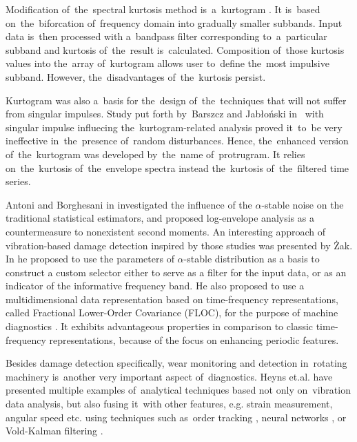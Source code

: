 Modification of~the~spectral kurtosis method is~a~kurtogram \cite{antoni2007fast}. It is~based on~the~biforcation of~frequency domain into gradually smaller subbands. Input data is~then processed with a~bandpass filter corresponding to~a~particular subband and kurtosis of~the~result is~calculated. Composition of~those kurtosis values into the~array of~kurtogram allows user to~define the~most impulsive subband. However, the~disadvantages of~the~kurtosis persist. 

Kurtogram was also a~basis for the~design of~the~techniques that will not suffer from singular impulses. Study put forth by~Barszcz and Jabłoński in~\cite{barszcz_mssp} with singular impulse influecing the~kurtogram-related analysis proved it~to~be very ineffective in~the~presence of~random disturbances. Hence, the~enhanced version of~the~kurtogram was developed by~the~name of~protrugram. It relies on~the~kurtosis of~the~envelope spectra instead the~kurtosis of~the~filtered time series.

Antoni and Borghesani in \cite{BORGHESANI2017378} investigated the influence of the $\alpha$-stable noise on the traditional statistical estimators, and proposed log-envelope analysis as a countermeasure to nonexistent second moments. An interesting approach of vibration-based damage detection inspired by those studies was presented by Żak. In \cite{11419466920160301} he proposed to use the parameters of $\alpha$-stable distribution as a basis to construct a custom selector either to serve as a filter for the input data, or as an indicator of the informative frequency band. He also proposed to use a multidimensional data representation based on time-frequency representations, called Fractional Lower-Order Covariance (FLOC), for the purpose of machine diagnostics \cite{Zak2014}. It exhibits advantageous properties in comparison to classic time-frequency representations, because of the focus on enhancing periodic features.

Besides damage detection specifically, wear monitoring and detection in~rotating machinery is~another very important aspect of~diagnostics. Heyns et.al. have presented multiple examples of~analytical techniques based not only on~vibration data analysis, but also fusing it~with other features, e.g. strain measurement, angular speed etc. \cite{stander2002using,scheffer2001wear} using techniques such as~order tracking \cite{wang2011combined,wang2012application}, neural networks \cite{herzog2009machine,ngwangwa2014reconstruction}, or Vold-Kalman filtering \cite{wang2009vold,wang2011combined}.

